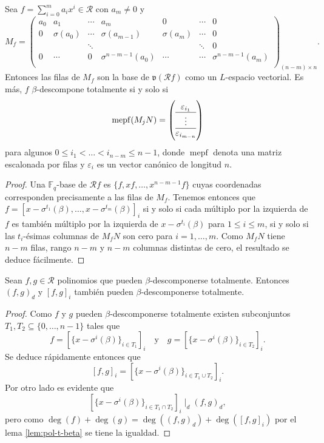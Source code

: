 \begin{lemma}
  Sea \(f = \sum_{i=0}^m a_ix^i \in \mathcal R\) con \(a_m \neq 0\) y
  \[
    M_f = \begin{pmatrix}
      a_0 & a_1 & \cdots & a_m & 0 & \cdots & 0 \\
      0 & \sigma(a_0) & \cdots & \sigma(a_{m-1}) & \sigma(a_m) & \cdots & 0 \\
       &  & \ddots &  &  & \ddots & 0 \\
      0 & \cdots & 0 & \sigma^{n-m-1}(a_0) & \cdots & \cdots & \sigma^{n-m-1}(a_m) \\
    \end{pmatrix}_{(n-m) \times n}.
  \]
  Entonces las filas de \(M_f\) son la base de \(\mathfrak v(\mathcal Rf)\) como un \(L\)-espacio vectorial.
  Es más, \(f\) \(\beta\)-descompone totalmente si y solo si 
  \[
    \operatorname{mepf}(M_jN) = \left( \begin{array}{@{}c@{}}
      \varepsilon_{i_1}\\\hline
      \vdots\\\hline
      \varepsilon_{i_{m-n}}
    \end{array}\right)
  \]
  para algunos \(0 \leq i_1 < \dots < i_{n-m} \leq n -1\), donde \(\operatorname{mepf}\) denota una matriz escalonada por filas y \(\varepsilon_i\) es un vector canónico de longitud \(n\).
\end{lemma}
\begin{proof}
  Una \(\mathbb F_q\)-base de \(\mathcal Rf\) es \(\{f, xf, \dots, x^{n-m-1}f\}\) cuyas coordenadas corresponden precisamente a las filas de \(M_f\).
  Tenemos entonces que \(f = \left[x - \sigma^{t_1}(\beta), \dots, x - \sigma^{t_m}(\beta)\right]_i\) si y solo si cada múltiplo por la izquierda de \(f\) es también múltiplo por la izquierda de \(x - \sigma^{t_i}(\beta)\) para \(1 \leq i \leq m\), si y solo si las \(t_i\)-ésimas columnas de \(M_fN\) son cero para \(i = 1, \dots, m\).
  Como \(M_fN\) tiene \(n - m\) filas, rango \(n - m\) y \(n - m\) columnas distintas de cero, el resultado se deduce fácilmente.
\end{proof}
\begin{lemma}
  Sean \(f, g \in \mathcal R\) polinomios que pueden \(\beta\)-descomponerse totalmente.
  Entonces \((f, g)_d\) y \([f, g]_i\) también pueden \(\beta\)-descomponerse totalmente.
\end{lemma}

\begin{proof}
  Como \(f\) y \(g\) pueden \(\beta\)-descomponerse totalmente existen subconjuntos \(T_1, T_2 \subseteq \{0, \dots, n - 1\}\) tales que 
  \[
    f = \left[\{x - \sigma^i(\beta)\}_{i \in T_1}\right]_i \quad \text{y} \quad g = \left[\{x - \sigma^i(\beta)\}_{i \in T_2}\right]_i.
  \]
  Se deduce rápidamente entonces que
  \[
    [f, g]_i = \left[\{x - \sigma^i(\beta)\}_{i \in T_1 \cup T_2}\right]_i.
  \]
  Por otro lado es evidente que 
  \[
    \left[\{x - \sigma^i(\beta)\}_{i \in T_1 \cap T_2}\right]_i \mid_d (f, g)_d,
  \]
  pero como \(\deg(f) + \deg(g) = \deg((f, g)_d) + \deg([f, g]_i)\) por el lema \ref{lem:pol-t-beta} se tiene la igualdad.
\end{proof}

